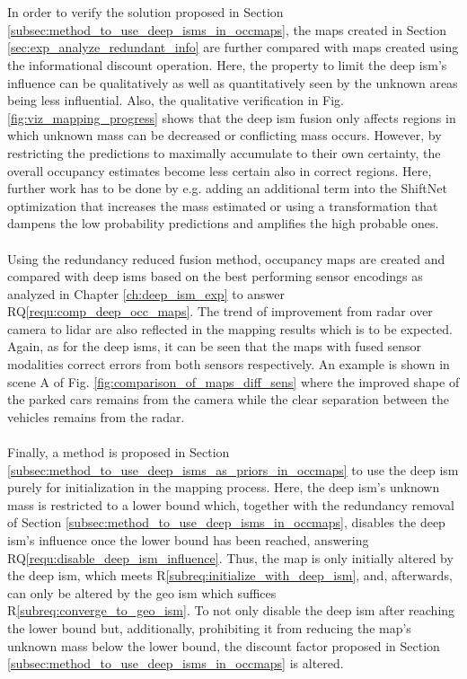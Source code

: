 \\\\
In order to verify the solution proposed in Section \ref{subsec:method_to_use_deep_isms_in_occmaps}, the maps created in Section \ref{sec:exp_analyze_redundant_info} are further compared with maps created using the informational discount operation. Here, the property to limit the deep \gls{ism}'s influence can be qualitatively as well as quantitatively seen by the unknown areas being less influential. Also, the qualitative verification in Fig. \ref{fig:viz_mapping_progress} shows that the deep \gls{ism} fusion only affects regions in which unknown mass can be decreased or conflicting mass occurs. However, by restricting the predictions to maximally accumulate to their own certainty, the overall occupancy estimates become less certain also in correct regions. Here, further work has to be done by e.g. adding an additional term into the ShiftNet optimization that increases the mass estimated or using a transformation that dampens the low probability predictions and amplifies the high probable ones.
\\\\
Using the redundancy reduced fusion method, occupancy maps are created and compared with deep \gls{ism}s based on the best performing sensor encodings as analyzed in Chapter \ref{ch:deep_ism_exp} to answer RQ\ref{requ:comp_deep_occ_maps}. The trend of improvement from radar over camera to lidar are also reflected in the mapping results which is to be expected. Again, as for the deep \gls{ism}s, it can be seen that the maps with fused sensor modalities correct errors from both sensors respectively. An example is shown in scene A of Fig. \ref{fig:comparison_of_maps_diff_sens} where the improved shape of the parked cars remains from the camera while the clear separation between the vehicles remains from the radar.
\\\\
Finally, a method is proposed in Section \ref{subsec:method_to_use_deep_isms_as_priors_in_occmaps} to use the deep \gls{ism} purely for initialization in the mapping process. Here, the deep \gls{ism}'s unknown mass is restricted to a lower bound which, together with the redundancy removal of Section \ref{subsec:method_to_use_deep_isms_in_occmaps}, disables the deep \gls{ism}'s influence once the lower bound has been reached, answering RQ\ref{requ:disable_deep_ism_influence}. Thus, the map is only initially altered by the deep \gls{ism}, which meets R\ref{subreq:initialize_with_deep_ism}, and, afterwards, can only be altered by the geo \gls{ism} which suffices R\ref{subreq:converge_to_geo_ism}. To not only disable the deep \gls{ism} after reaching the lower bound but, additionally, prohibiting it from reducing the map's unknown mass below the lower bound, the discount factor proposed in Section \ref{subsec:method_to_use_deep_isms_in_occmaps} is altered.
